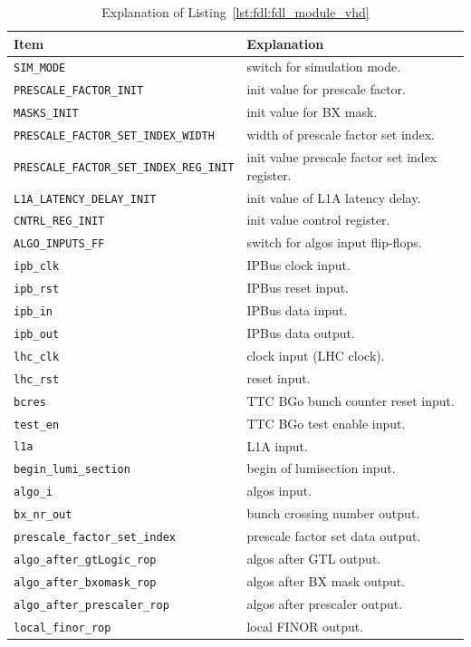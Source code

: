 \medskip
\begin{table}
\footnotesize
\caption{Explanation of Listing~\ref{lst:fdl:fdl_module_vhd}}
\vspace{5mm}
\centering
\begin{tabular}{l p{}}
\toprule
{Item} & {Explanation}\\
\midrule
\verb|SIM_MODE| & switch for simulation mode.\\
\verb|PRESCALE_FACTOR_INIT| & init value for prescale factor.\\
\verb|MASKS_INIT| & init value for BX mask.\\
\verb|PRESCALE_FACTOR_SET_INDEX_WIDTH| & width of prescale factor set index.\\
\verb|PRESCALE_FACTOR_SET_INDEX_REG_INIT| & init value prescale factor set index register.\\
\verb|L1A_LATENCY_DELAY_INIT| & init value of L1A latency delay.\\
\verb|CNTRL_REG_INIT| & init value control register.\\
\verb|ALGO_INPUTS_FF| & switch for algos input flip-flops.\\
\verb|ipb_clk| & IPBus clock input.\\
\verb|ipb_rst| & IPBus reset input.\\
\verb|ipb_in| & IPBus data input.\\
\verb|ipb_out| & IPBus data output.\\
\verb|lhc_clk| & clock input (LHC clock).\\
\verb|lhc_rst| & reset input.\\
\verb|bcres| & TTC BGo bunch counter reset input.\\
\verb|test_en| & TTC BGo test enable input.\\
\verb|l1a| & L1A input.\\
\verb|begin_lumi_section| & begin of lumisection input.\\
\verb|algo_i| & algos input.\\
\verb|bx_nr_out| & bunch crossing number output.\\
\verb|prescale_factor_set_index| & prescale factor set data output.\\
\verb|algo_after_gtLogic_rop| & algos after GTL output.\\
\verb|algo_after_bxomask_rop| & algos after BX mask output.\\
\verb|algo_after_prescaler_rop| & algos after prescaler output.\\
\verb|local_finor_rop| & local FINOR output.\\

\end{tabular}
\end{table}
